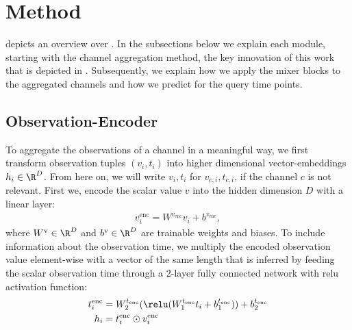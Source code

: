 \section{Method}
 depicts an overview over \model{}.
In the subsections below we explain each module, starting with
the channel aggregation method, the key innovation of this work that is depicted in . 
Subsequently, we explain how we apply the mixer blocks to the aggregated channels and how we predict for the query time points.
\subsection{Observation-Encoder}\label{sec:obsenc}
To aggregate the observations of a channel in a meaningful way, we first transform observation tuples $(v_i, t_i)$ into higher dimensional vector-embeddings $h_i \in \R^D$.
From here on, we will write $v_i, t_i$ for $v_{c,i}, t_{c,i}$, if the channel $c$ is not relevant. 
First we, encode the scalar value $v$ into the hidden dimension $D$ with a linear layer:
\begin{align}
    v_i^{\text{enc}} = W^{v_\text{enc}} v_i +  b^{v_\text{enc}}, 
\end{align}
where $W^{\text{v}} \in \R^{D}$ and $b^{\text{v}} \in \R^{D}$ are trainable weights and biases.
To include information about the observation time, we multiply the encoded observation value
element-wise with a vector of the same length that is inferred by feeding the scalar observation time through a 2-layer fully connected network with relu activation function:
\begin{align}\label{eq:obs_encoding}
    t^\text{enc}_i &= W_2^{t_\text{enc}}(\relu(W_1^{t_\text{enc}}t_i + b^{t_\text{enc}}_1)) + b^{t_\text{enc}}_2 \\
    h_i &=  t^\text{enc}_i \odot v^\text{enc}_i 
\end{align}



